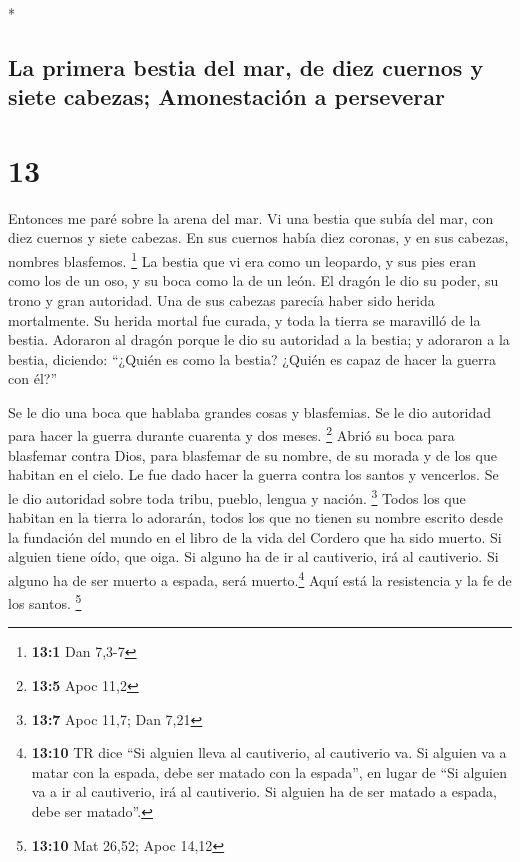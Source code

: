 \begin{paracol}{2}
\begin{otherlanguage}{english}
\end{otherlanguage}

\switchcolumn[0]*

\hypertarget{la-primera-bestia-del-mar-de-diez-cuernos-y-siete-cabezas-amonestaciuxf3n-a-perseverar}{%
\subsection{La primera bestia del mar, de diez cuernos y siete cabezas;
Amonestación a
perseverar}\label{la-primera-bestia-del-mar-de-diez-cuernos-y-siete-cabezas-amonestaciuxf3n-a-perseverar}}

\hypertarget{section-24}{%
\section{13}\label{section-24}}

 Entonces me paré sobre la arena del mar. Vi una bestia
que subía del mar, con diez cuernos y siete cabezas. En sus cuernos
había diez coronas, y en sus cabezas, nombres blasfemos. \footnote{\textbf{13:1}
  Dan 7,3-7}  La bestia que vi era como un leopardo, y sus
pies eran como los de un oso, y su boca como la de un león. El dragón le
dio su poder, su trono y gran autoridad.  Una de sus
cabezas parecía haber sido herida mortalmente. Su herida mortal fue
curada, y toda la tierra se maravilló de la bestia. 
Adoraron al dragón porque le dio su autoridad a la bestia; y adoraron a
la bestia, diciendo: ``¿Quién es como la bestia? ¿Quién es capaz de
hacer la guerra con él?''

 Se le dio una boca que hablaba grandes cosas y
blasfemias. Se le dio autoridad para hacer la guerra durante cuarenta y
dos meses. \footnote{\textbf{13:5} Apoc 11,2}  Abrió su
boca para blasfemar contra Dios, para blasfemar de su nombre, de su
morada y de los que habitan en el cielo.  Le fue dado
hacer la guerra contra los santos y vencerlos. Se le dio autoridad sobre
toda tribu, pueblo, lengua y nación. \footnote{\textbf{13:7} Apoc 11,7;
  Dan 7,21}  Todos los que habitan en la tierra lo
adorarán, todos los que no tienen su nombre escrito desde la fundación
del mundo en el libro de la vida del Cordero que ha sido muerto.
 Si alguien tiene oído, que oiga.  Si
alguno ha de ir al cautiverio, irá al cautiverio. Si alguno ha de ser
muerto a espada, será muerto.\footnote{\textbf{13:10} TR dice ``Si
  alguien lleva al cautiverio, al cautiverio va. Si alguien va a matar
  con la espada, debe ser matado con la espada'', en lugar de ``Si
  alguien va a ir al cautiverio, irá al cautiverio. Si alguien ha de ser
  matado a espada, debe ser matado''.} Aquí está la resistencia y la fe
de los santos. \footnote{\textbf{13:10} Mat 26,52; Apoc 14,12}


\end{paracol}

